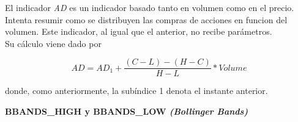 \begin{appendices}
El indicador \textit{AD} es un indicador basado tanto en volumen como en el precio. Intenta resumir como se distribuyen las compras de acciones en funcion del volumen. Este indicador, al igual que el anterior, no recibe par\'ametros.\\

Su c\'alculo viene dado por

\[AD = AD_{1} + \frac{(C - L) - (H - C)}{H - L}*Volume \]

donde, como anteriormente, la sub\'indice 1 denota el instante anterior.

\vspace{0.5cm}
\noindent\textbf{BBANDS\_HIGH y BBANDS\_LOW \textit{(Bollinger Bands)}}\\



\end{appendices}
